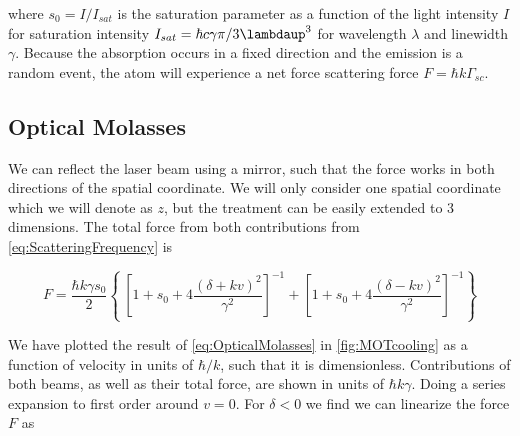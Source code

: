 where $s_0 = I/I_{sat}$ is the saturation parameter as a function of the light intensity $I$ for saturation intensity $I_{sat} = \hbar c \gamma \pi/3\lambdaup^3$ for wavelength $\lambda$ and linewidth $\gamma$.
Because the absorption occurs in a fixed direction and the emission is a random event, the atom will experience a net force scattering force $F = \hbar k \Gamma_{sc}$.

\subsection{Optical Molasses}

We can reflect the laser beam using a mirror, such that the force works in both directions of the spatial coordinate.
We will only consider one spatial coordinate which we will denote as $z$, but the treatment can be easily extended to 3 dimensions.
The total force from both contributions from \cref{eq:ScatteringFrequency} is \cite{Kowalski2010}

\begin{equation}\label{eq:OpticalMolasses}
	F = \frac{\hbar k \gamma s_0}{2}\left\{\
	\left[1 + s_0 + 4\frac{(\delta+kv)^2}{\gamma^2}\right]^{-1}+
	\left[1 + s_0 + 4\frac{(\delta-kv)^2}{\gamma^2}\right]^{-1}
	\right\}
\end{equation}

We have plotted the result of \cref{eq:OpticalMolasses} in \cref{fig:MOTcooling} as a function of velocity in units of $\hbar / k$, such that it is dimensionless. Contributions of both beams, as well as their total force, are shown in units of $\hbar k \gamma$.
Doing a series expansion to first order around $v = 0$.
For $\delta<0$ we find we can linearize the force $F$ as \cite{Metcalf1999}

